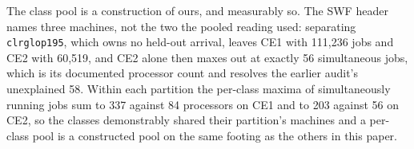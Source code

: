 \documentclass[mathematics,supfile,submit,moreauthors]{Definitions/mdpi}
\newcommand{\devnum}[1]{#1}
\begin{document}
The class pool is a construction of ours, and measurably so. The SWF header names three
machines, not the two the pooled reading used: separating \texttt{clrglop195}, which owns
no held-out arrival, leaves CE1 with \devnum{111{,}236} jobs and CE2 with
\devnum{60{,}519}, and CE2 alone then maxes out at exactly \devnum{56} simultaneous jobs,
which is its documented processor count and resolves the earlier audit's unexplained
\devnum{58}. Within each partition the per-class maxima of simultaneously running jobs
sum to \devnum{337} against \devnum{84} processors on CE1 and to \devnum{203} against
\devnum{56} on CE2, so the classes demonstrably shared their partition's machines and a
per-class pool is a constructed pool on the same footing as the others in this paper.
\end{document}
